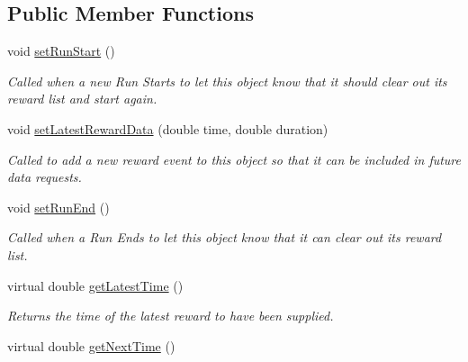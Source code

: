 \subsection*{Public Member Functions}
\begin{DoxyCompactItemize}
\item 
\hypertarget{class_picto_1_1_live_reward_reader_a1f016e92c0b7fce54ce6690786705878}{void \hyperlink{class_picto_1_1_live_reward_reader_a1f016e92c0b7fce54ce6690786705878}{set\-Run\-Start} ()}\label{class_picto_1_1_live_reward_reader_a1f016e92c0b7fce54ce6690786705878}

\begin{DoxyCompactList}\small\item\em Called when a new Run Starts to let this object know that it should clear out its reward list and start again. \end{DoxyCompactList}\item 
void \hyperlink{class_picto_1_1_live_reward_reader_ac1061add1e058abbb6e67d1348e19381}{set\-Latest\-Reward\-Data} (double time, double duration)
\begin{DoxyCompactList}\small\item\em Called to add a new reward event to this object so that it can be included in future data requests. \end{DoxyCompactList}\item 
\hypertarget{class_picto_1_1_live_reward_reader_a3a7c24b3a249a20e9d032c161ea24c2c}{void \hyperlink{class_picto_1_1_live_reward_reader_a3a7c24b3a249a20e9d032c161ea24c2c}{set\-Run\-End} ()}\label{class_picto_1_1_live_reward_reader_a3a7c24b3a249a20e9d032c161ea24c2c}

\begin{DoxyCompactList}\small\item\em Called when a Run Ends to let this object know that it can clear out its reward list. \end{DoxyCompactList}\item 
\hypertarget{class_picto_1_1_live_reward_reader_a5c076bbf2abe4f4c4b4bd7d159c38f9d}{virtual double \hyperlink{class_picto_1_1_live_reward_reader_a5c076bbf2abe4f4c4b4bd7d159c38f9d}{get\-Latest\-Time} ()}\label{class_picto_1_1_live_reward_reader_a5c076bbf2abe4f4c4b4bd7d159c38f9d}

\begin{DoxyCompactList}\small\item\em Returns the time of the latest reward to have been supplied. \end{DoxyCompactList}\item 
\hypertarget{class_picto_1_1_live_reward_reader_a11f45af8ab874cf276803c41887f69c3}{virtual double \hyperlink{class_picto_1_1_live_reward_reader_a11f45af8ab874cf276803c41887f69c3}{get\-Next\-Time} ()}\label{class_picto_1_1_live_reward_reader_a11f45af8ab874cf276803c41887f69c3}


\end{DoxyCompactItemize}
